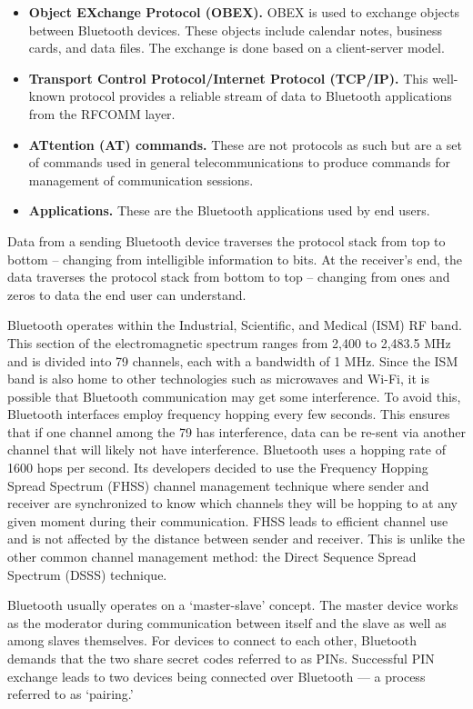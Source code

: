 \documentclass[12pt,svgnames,smaller]{article} %
\begin{document}
\begin{enumerate}
\begin{itemize}
			\item \textbf{Object EXchange Protocol (OBEX).} OBEX is used to exchange objects between Bluetooth devices. These objects include calendar notes, business cards, and data files. The exchange is done based on a client-server model.
			\item \textbf{Transport Control Protocol/Internet Protocol (TCP/IP).} This well-known protocol provides a reliable stream of data to Bluetooth applications from the RFCOMM layer.
			\item \textbf{ATtention (AT) commands.} These are not protocols as such but are a set of commands used in general telecommunications to produce commands for management of communication sessions.
			\item \textbf{Applications.} These are the Bluetooth applications used by end users.
		\end{itemize}
		
		Data from a sending Bluetooth device traverses the protocol stack from top to bottom – changing from intelligible information to bits. At the receiver’s end, the data traverses the protocol stack from bottom to top – changing from ones and zeros to data the end user can understand.
		
		Bluetooth operates within the Industrial, Scientific, and Medical (ISM) RF band. This section of the electromagnetic spectrum ranges from 2,400 to 2,483.5 MHz and is divided into 79 channels, each with a bandwidth of 1 MHz. Since the ISM band is also home to other technologies such as microwaves and Wi-Fi, it is possible that Bluetooth communication may get some interference. To avoid this, Bluetooth interfaces employ frequency hopping every few seconds. This ensures that if one channel among the 79 has interference, data can be re-sent via another channel that will likely not have interference. Bluetooth uses a hopping rate of 1600 hops per second. Its developers decided to use the Frequency Hopping Spread Spectrum (FHSS) channel management technique where sender and receiver are synchronized to know which channels they will be hopping to at any given moment during their communication. FHSS leads to efficient channel use and is not affected by the distance between sender and receiver. This is unlike the other common channel management method: the Direct Sequence Spread Spectrum (DSSS) technique.
		
		Bluetooth usually operates on a ‘master-slave’ concept. The master device works as the moderator during communication between itself and the slave as well as among slaves themselves. For devices to connect to each other, Bluetooth demands that the two share secret codes referred to as PINs. Successful PIN exchange leads to two devices being connected over Bluetooth --- a process referred to as ‘pairing.’
		

\end{enumerate}
\end{document}
